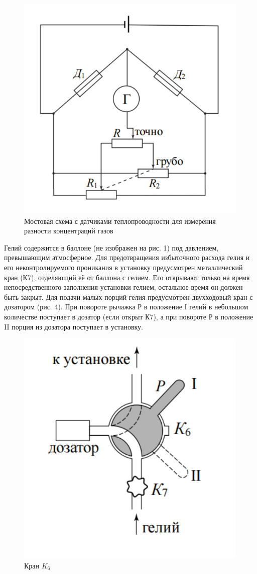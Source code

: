 \documentclass[a4paper, 12pt]{article}
\begin{document}
\begin{center}
\begin{figure}[H]
    \centering
    \includegraphics[width=7.5 cm]{scheme.PNG}
    \caption{Мостовая схема с датчиками теплопроводности для измерения разности концентраций газов}
    \label{fig:vac}
\end{figure} 

\item Гелий содержится в баллоне (не изображен на рис. 1) под давлением, превышающим атмосферное. Для предотвращения избыточного расхода гелия и
его неконтролируемого проникания в установку предусмотрен металлический кран (К7), отделяющий её от баллона с гелием. Его открывают только на
время непосредственного заполнения установки гелием, остальное время он должен быть закрыт. Для подачи малых порций гелия предусмотрен двухходовый кран с дозатором (рис. 4). При повороте рычажка Р в положение I гелий в небольшом количестве поступает в дозатор (если открыт К7), а при повороте Р в положение II порция из дозатора поступает в установку.

\begin{figure}[H]
    \centering
    \includegraphics[width=6.5 cm]{crane.PNG}
    \caption{Кран $K_6$}
    \label{fig:vac}
\end{figure}


\end{center}
\end{document}
